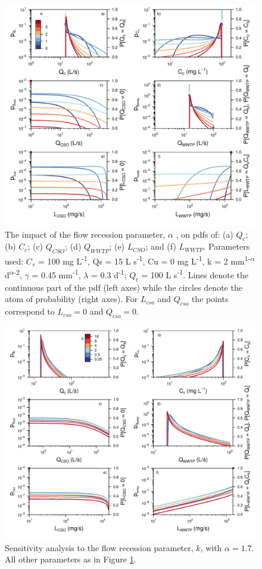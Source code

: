 \documentclass[draft,linenumbers]{agujournal2018}
\begin{document}
\begin{figure}[ht]
 \centering
\includegraphics[width=30pc]{Fig6.pdf}
 \caption{The impact of the f\/low recession parameter, $\alpha$ , on pdfs of: (a) $Q_c$; (b) $C_c$; (c) $Q_{CSO}$; (d) $Q_{WWTP}$; (e) $L_{CSO}$; and (f) $L_{WWTP}$. Parameters used: $C_s$ = 100 mg L\textsuperscript{-1}, Qs = 15 L s\textsuperscript{-1}, Cu = 0 mg L\textsuperscript{-1}, k = 2 mm\textsuperscript{1-$\alpha$} d\textsuperscript{$\alpha$-2}, $\gamma$ = 0.45 mm\textsuperscript{-1}, $\lambda$ = 0.3 d\textsuperscript{-1}; $Q_t$ = 100 L s\textsuperscript{-1}. Lines denote the continuous part of the pdf (left axes) while the circles denote the atom of probability (right axes). For $L_{cso}$ and $Q_{cso}$ the points correspond to $L_{cso} = 0$ and $Q_{cso} = 0$.}
 \label{figsix}
 \end{figure}

 
\begin{figure}[ht]
 \centering
 \includegraphics[width=30pc]{Fig7.pdf}
\caption{Sensitivity analysis to the f\/low recession parameter, $k$, with $\alpha = 1.7$. All other parameters as in Figure \ref{figsix}.}
 \label{figseven}
 \end{figure}
\end{document}
